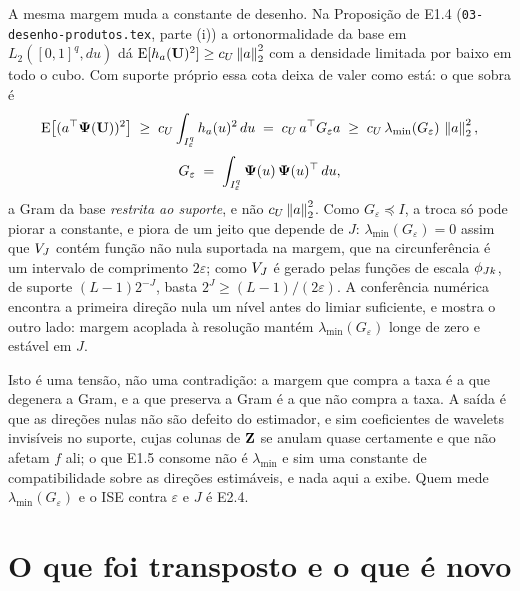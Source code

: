 \documentclass[11pt,a4paper]{article}
\begin{document}
\begin{remark}\label{rem:gram}
A mesma margem muda a constante de desenho. Na Proposição de E1.4
(\texttt{03-desenho-produtos.tex}, parte (i)) a ortonormalidade da base em
$L_{2}([0,1]^{q}, du)$ dá $\mathrm{E}[h_{a}(\mathbf{U})^{2}] \ge c_{U}\left\lVert a \right\rVert_{2}^{2}$
com a densidade limitada por baixo em todo o cubo. Com suporte próprio essa
cota deixa de valer como está: o que sobra é
\[
  \mathrm{E}\bigl[(a^{\top}\boldsymbol{\Psi}(\mathbf{U}))^{2}\bigr] \;\ge\; c_{U}
  \int_{I_{\varepsilon}^{q}} h_{a}(u)^{2}\,du
  \;=\; c_{U}\,a^{\top} G_{\varepsilon}a
  \;\ge\; c_{U}\,\lambda_{\min}(G_{\varepsilon})\,\left\lVert a \right\rVert_{2}^{2},
\]
\[
  G_{\varepsilon} \;=\; \int_{I_{\varepsilon}^{q}}
  \boldsymbol{\Psi}(u)\,\boldsymbol{\Psi}(u)^{\top}\,du ,
\]
a Gram da base \emph{restrita ao suporte}, e não $c_{U}\left\lVert a \right\rVert_{2}^{2}$.
Como $G_{\varepsilon} \preceq I$, a troca só pode piorar a constante, e
piora de um jeito que depende de $J$: $\lambda_{\min}(G_{\varepsilon}) = 0$
assim que $V_{J}$ contém função não nula suportada na margem, que na
circunferência é um intervalo de comprimento $2\varepsilon$; como $V_{J}$ é
gerado pelas funções de escala $\phi_{Jk}$, de suporte
$(L-1)2^{-J}$, basta $2^{J} \ge (L-1)/(2\varepsilon)$. A conferência
numérica encontra a primeira direção nula um nível antes do limiar
suficiente, e mostra o outro lado: margem acoplada à resolução mantém
$\lambda_{\min}(G_{\varepsilon})$ longe de zero e estável em $J$.

Isto é uma tensão, não uma contradição: a margem que compra a taxa é a que
degenera a Gram, e a que preserva a Gram é a que não compra a taxa. A saída
é que as direções nulas não são defeito do estimador, e sim coeficientes de
wavelets invisíveis no suporte, cujas colunas de $\mathbf{Z}$ se anulam quase
certamente e que não afetam $f$ ali; o que E1.5 consome não é
$\lambda_{\min}$ e sim uma constante de compatibilidade sobre as direções
estimáveis, e nada aqui a exibe. Quem mede $\lambda_{\min}(G_{\varepsilon})$
e o ISE contra $\varepsilon$ e $J$ é E2.4.
\end{remark}

\section{O que foi transposto e o que é novo}
\end{document}
